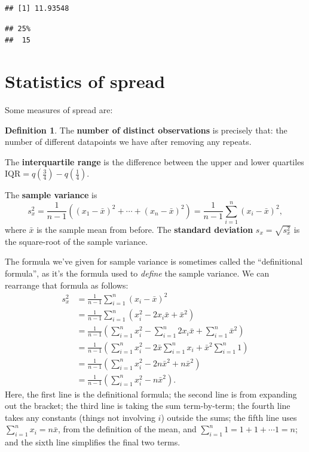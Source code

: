 \documentclass[
  a4paper,
]{book}
\newenvironment{Shaded}{\begin{snugshade}}{\end{snugshade}}
\newcommand{\AttributeTok}[1]{\textcolor[rgb]{0.77,0.63,0.00}{#1}}
\newcommand{\DecValTok}[1]{\textcolor[rgb]{0.00,0.00,0.81}{#1}}
\newcommand{\FunctionTok}[1]{\textcolor[rgb]{0.00,0.00,0.00}{#1}}
\newcommand{\NormalTok}[1]{#1}
\newcommand{\SpecialCharTok}[1]{\textcolor[rgb]{0.00,0.00,0.00}{#1}}
\theoremstyle{definition}
\newtheorem{definition}{Definition}[chapter]
\theoremstyle{definition}
\theoremstyle{definition}
\theoremstyle{definition}
\theoremstyle{remark}
\begin{document}
\begin{verbatim}
## [1] 11.93548
\end{verbatim}

\begin{Shaded}
\end{Shaded}

\begin{verbatim}
## 25% 
##  15
\end{verbatim}

\hypertarget{stat-spread}{%
\section{Statistics of spread}\label{stat-spread}}

Some measures of spread are:

\begin{definition}
The \textbf{number of distinct observations} is precisely that: the number of different datapoints we have after removing any repeats.

The \textbf{interquartile range} is the difference between the upper and lower quartiles \(\text{IQR} = q(\frac34) - q(\frac14)\).

The \textbf{sample variance} is
\[  s^2_x = \frac{1}{n-1} \left((x_1 - \bar x)^2 + \cdots + (x_n - \bar x)^2 \right) = \frac{1}{n-1} \sum_{i=1}^n (x_i - \bar x)^2 , \]
where \(\bar x\) is the sample mean from before. The \textbf{standard deviation} \(s_x = \sqrt{s^2_x}\) is the square-root of the sample variance.
\end{definition}

The formula we've given for sample variance is sometimes called the ``definitional formula'', as it's the formula used to \emph{define} the sample variance. We can rearrange that formula as follows:
\begin{align*}
  s^2_x &= \frac{1}{n-1} \sum_{i=1}^n (x_i - \bar x)^2 \\
      &= \frac{1}{n-1} \sum_{i=1}^n (x_i^2 - 2x_i\bar x + \bar x^2) \\
      &= \frac{1}{n-1}\left(\sum_{i=1}^nx_i^2 - \sum_{i=1}^n 2x_i\bar x + \sum_{i=1}^n\bar x^2 \right) \\
      &= \frac{1}{n-1} \left(\sum_{i=1}^n x_i^2 - 2\bar x \sum_{i=1}^n x_i + \bar x^2 \sum_{i=1}^n 1 \right) \\
      &= \frac{1}{n-1} \left(\sum_{i=1}^n x_i^2 - 2n\bar x^2 + n\bar x^2 \right) \\
      &= \frac{1}{n-1} \left(\sum_{i=1}^n x_i^2 -  n\bar x^2 \right) .
\end{align*}
Here, the first line is the definitional formula; the second line is from expanding out the bracket; the third line is taking the sum term-by-term; the fourth line takes any constants (things not involving \(i\)) outside the sums; the fifth line uses \(\sum_{i=1}^n x_i = n\bar x\), from the definition of the mean, and \(\sum_{i=1}^n 1 = 1 + 1 + \cdots 1 = n\); and the sixth line simplifies the final two terms.
\end{document}
